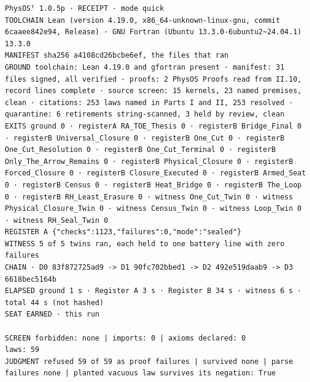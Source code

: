 \documentclass[10pt]{article}
\begin{document}
\begin{Verbatim}[fontsize=\fontsize{6.0}{7.0}\selectfont,breaklines,breakanywhere,breaksymbolleft={}]
PhysOSᵀ 1.0.5p · RECEIPT · mode quick
TOOLCHAIN Lean (version 4.19.0, x86_64-unknown-linux-gnu, commit 6caaee842e94, Release) · GNU Fortran (Ubuntu 13.3.0-6ubuntu2~24.04.1) 13.3.0
MANIFEST sha256 a4108cd26bcbe6ef, the files that ran
GROUND toolchain: Lean 4.19.0 and gfortran present · manifest: 31 files signed, all verified · proofs: 2 PhysOS Proofs read from II.10, record lines complete · source screen: 15 kernels, 23 named premises, clean · citations: 253 laws named in Parts I and II, 253 resolved · quarantine: 6 retirements string-scanned, 3 held by review, clean
EXITS ground 0 · registerA RA_TOE_Thesis 0 · registerB Bridge_Final 0 · registerB Universal_Closure 0 · registerB One_Cut 0 · registerB One_Cut_Resolution 0 · registerB One_Cut_Terminal 0 · registerB Only_The_Arrow_Remains 0 · registerB Physical_Closure 0 · registerB Forced_Closure 0 · registerB Closure_Executed 0 · registerB Armed_Seat 0 · registerB Census 0 · registerB Heat_Bridge 0 · registerB The_Loop 0 · registerB RH_Least_Erasure 0 · witness One_Cut_Twin 0 · witness Physical_Closure_Twin 0 · witness Census_Twin 0 · witness Loop_Twin 0 · witness RH_Seal_Twin 0
REGISTER A {"checks":1123,"failures":0,"mode":"sealed"}
WITNESS 5 of 5 twins ran, each held to one battery line with zero failures
CHAIN · D0 83f872725ad9 -> D1 90fc702bbed1 -> D2 492e519daab9 -> D3 6618bec5164b
ELAPSED ground 1 s · Register A 3 s · Register B 34 s · witness 6 s · total 44 s (not hashed)
SEAT EARNED · this run

SCREEN forbidden: none | imports: 0 | axioms declared: 0
laws: 59
JUDGMENT refused 59 of 59 as proof failures | survived none | parse failures none | planted vacuous law survives its negation: True
\end{Verbatim}
\end{document}
